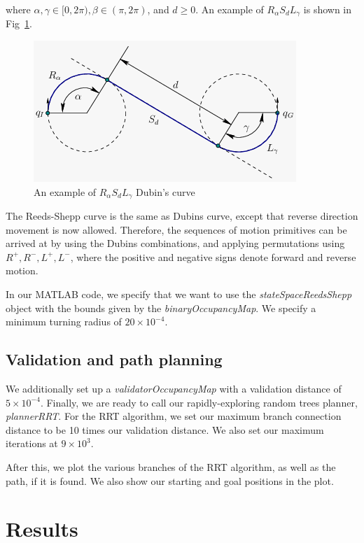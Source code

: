 \documentclass[conference]{IEEEtran}
\begin{document}
where $\alpha, \gamma \in [0, 2\pi), \beta \in (\pi, 2\pi)$, and $d \geq 0$. An example of
$R_\alpha S_d L_\gamma$ is shown in Fig~\ref{dubins-eg}.

\begin{figure}[h]
    \centering
    \includegraphics[scale=0.5]{dubins-img.png}
    \caption{An example of $R_\alpha S_d L_\gamma$ Dubin's curve}
    \label{dubins-eg}
\end{figure}

The Reeds-Shepp curve is the same as Dubins curve, except that reverse direction
movement is now allowed. Therefore, the sequences of motion primitives can be arrived
at by using the Dubins combinations, and applying permutations using $R^+, R^-, L^+, L^-$,
where the positive and negative signs denote forward and reverse motion.

In our MATLAB code, we specify that we want to use the \textit{stateSpaceReedsShepp} object with
the bounds given by the \textit{binaryOccupancyMap}. We specify a minimum turning radius
of $20 \times 10^{-4}$.

\subsection{Validation and path planning}

We additionally set up a \textit{validatorOccupancyMap} with a validation distance
of $5 \times 10^{-4}$. Finally, we are ready to call our rapidly-exploring random trees
planner, \textit{plannerRRT}. For the RRT algorithm, we set our maximum branch connection
distance to be 10 times our validation distance. We also set our maximum iterations at
$9 \times 10^3$.

After this, we plot the various branches of the RRT algorithm, as well as the path, if it is
found. We also show our starting and goal positions in the plot.

\section{Results}
\end{document}
